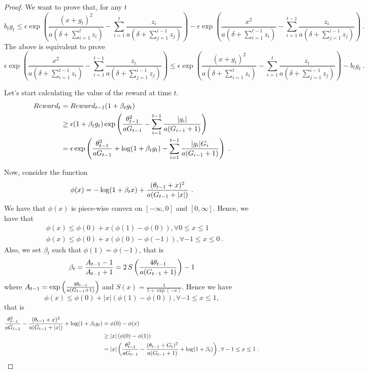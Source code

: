 \begin{proof}
We want to prove that, for any $t$
\[
b_t g_t 
\leq \epsilon \exp\left(\frac{(x+g_t)^2}{a (\delta+\sum_{i=1}^{t} z_i)}- \sum_{i=1}^{t} \frac{z_i}{a (\delta+\sum_{j=1}^{i-1} z_j)}\right)- \epsilon \exp\left(\frac{x^2}{a (\delta+\sum_{i=1}^{t-1} z_i)}- \sum_{i=1}^{t-1} \frac{z_i}{a (\delta+\sum_{j=1}^{i-1} z_j)}\right)~.
\]
The above is equivalent to prove
\[
\epsilon \exp\left(\frac{x^2}{a (\delta+\sum_{i=1}^{t-1} z_i)}- \sum_{i=1}^{t-1} \frac{z_i}{a (\delta+\sum_{j=1}^{i-1} z_j)}\right)
\leq \epsilon \exp\left(\frac{(x+g_t)^2}{a (\delta+\sum_{i=1}^{t} z_i)}- \sum_{i=1}^{t} \frac{z_i}{a (\delta+\sum_{j=1}^{i-1} z_j)}\right)- b_t g_t ~.
\]

Let's start calculating the value of the reward at time $t$.
\begin{align*}
Reward_{t} &= Reward_{t-1} (1+\beta_t g_t) \\
&\geq \epsilon (1+\beta_t g_t)\exp\left(\frac{\theta_{t-1}^2}{a G_{t-1}}- \sum_{i=1}^{t-1} \frac{|g_i|}{a (G_{i-1} + 1) }\right) \\
&=  \epsilon \exp\left(\frac{\theta_{t-1}^2}{a G_{t-1}}+\log(1+\beta_t g_t)- \sum_{i=1}^{t-1} \frac{|g_i| G_i}{a (G_{i-1} + 1)}\right)~.
\end{align*}

Now, consider the function 
\[
\phi(x)=-\log(1+\beta_t x) + \frac{(\theta_{t-1}+x)^2}{a (G_{t-1} + |x|)}~.
\]
We have that $\phi(x)$ is piece-wise convex on $[-\infty,0]$ and $[0,\infty]$. Hence, we have that
\begin{align*}
&\phi(x) \leq \phi(0)+x (\phi(1)-\phi(0)), \forall 0 \leq x\leq 1\\
&\phi(x) \leq \phi(0)+x (\phi(0)-\phi(-1)), \forall -1 \leq x\leq 0~.
\end{align*}
Also, we set $\beta_t$ such that $\phi(1)=\phi(-1)$, that is
\[
\beta_t = \frac{A_{t-1}-1}{A_{t-1}+1} 
= 2 \, S\left(\frac{4 \theta_{t-1}}{a (G_{t-1} + 1)}\right)-1
\]
where $A_{t-1}=\exp\left(\frac{4 \theta_{t-1}}{a (G_{t-1} + 1)}\right)$ and
$S(x) =\frac{1}{1+\exp(-x)}$.
Hence we have
\[
\phi(x) \leq \phi(0)+ |x| (\phi(1)-\phi(0)), \forall -1 \leq x\leq 1,
\]
that is
\begin{align*}
\frac{\theta_{t-1}^2}{a G_{t-1}}-\frac{(\theta_{t-1}+x)^2}{a (G_{t-1} +  |x|)} + \log(1+\beta_t g_t) 
& = \phi(0) - \phi(x) \\
& \geq |x| \left(\phi(0) - \phi(1)\right) \\
&= |x| \left(\frac{\theta_{t-1}^2}{a G_{t-1}} - \frac{(\theta_{t-1}+G_t)^2}{a (G_{t-1} + 1)} + \log(1+\beta_t)\right), \forall -1 \leq x\leq 1~.
\end{align*}


\end{proof}
